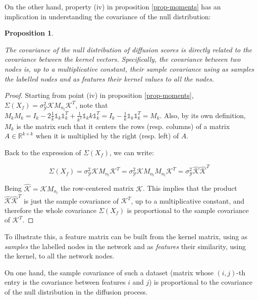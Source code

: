 \documentclass[12pt]{article}  %
\newtheorem{property}{Proposition}
\begin{document}
On the other hand, property (iv) in proposition \ref{prop-moments} has an implication in understanding the covariance of the null distribution:

\begin{property}
\label{prop:covar}

The covariance of the null distribution of diffusion scores is directly related to the covariance between the kernel vectors.
Specifically, the covariance between two nodes is, up to a multiplicative constant, their sample covariance using as samples the labelled nodes and as features their kernel values to all the nodes.

\end{property}

\begin{proof}
Starting from point (iv) in proposition \ref{prop-moments}, $ \Sigma(X_f) = \sigma_{\mathcal{Y}}^2 \mathcal{K} M_{n_l} \mathcal{K}^T$, note that $M_k M_k = I_k - 2\frac{1}{k}\mathbb{1}_k\mathbb{1}_k^T + \frac{1}{k^2}\mathbb{1}_k k\mathbb{1}_k^T = I_k - \frac{1}{k}\mathbb{1}_k\mathbb{1}_k^T = M_k$. 
Also, by its own definition, $M_k$ is the matrix such that it centers the rows (resp. columns) of a matrix $A \in \mathds{R}^{k \times k}$ when it is multiplied by the right (resp. left) of $A$. 

Back to the expression of $ \Sigma(X_f)$, we can write:

$$ \Sigma(X_f) = \sigma_{\mathcal{Y}}^2 \mathcal{K} M_{n_l} \mathcal{K}^T = \sigma_{\mathcal{Y}}^2 \mathcal{K} M_{n_l}  M_{n_l}  \mathcal{K}^T = \sigma_{\mathcal{Y}}^2 \hat{\mathcal{K}} \hat{\mathcal{K}}^T$$

Being $\hat{\mathcal{K}} = \mathcal{K} M_{n_l}$ the row-centered matrix $\mathcal{K}$. 
This implies that the product $\hat{\mathcal{K}} \hat{\mathcal{K}}^T$ is just the sample covariance of $\mathcal{K}^T$, up to a multiplicative constant, and therefore the whole covariance $ \Sigma(X_f) $ is proportional to the sample covariance of $\mathcal{K}^T$. 

\end{proof}


To illustrate this, a feature matrix can be built from the kernel matrix, using as \textit{samples} the labelled nodes in the network and as \textit{features} their similarity, using the kernel, to all the network nodes. 

On one hand, the sample covariance of such a dataset (matrix whose $(i, j)$-th entry is the covariance between features $i$ and $j$) is proportional to the covariance of the null distribution in the diffusion process. 
\end{document}
